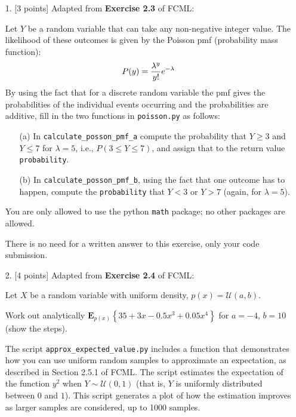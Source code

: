 \documentclass[10pt]{article}
\begin{document}
\begin{itemize}

\item[1.] [3 points]
Adapted from {\bf Exercise 2.3} of FCML:

Let $Y$ be a random variable that can take any non-negative integer value.  The likelihood of these outcomes is given by the Poisson pmf (probability mass function):
\begin{eqnarray}
P(y) = {\lambda^y\over y!} e^{-\lambda}
\end{eqnarray}
By using the fact that for a discrete random variable the pmf gives the probabilities of the individual events occurring and the probabilities are additive, fill in the two functions in {\tt poisson.py} as follows:
\begin{enumerate}
\item[(a)] In {\tt calculate\_posson\_pmf\_a} compute the probability that $Y \geq 3$ and $Y \leq 7$ for $\lambda = 5$, i.e., $P(3 \leq Y \leq 7)$, and assign that to the return value {\tt probability}.
\item[(b)] In {\tt calculate\_posson\_pmf\_b}, using the fact that one outcome has to happen, compute the {\tt probability} that $Y < 3$ or $Y > 7$ (again, for $\lambda = 5$).
\end{enumerate}
You are only allowed to use the python {\tt math} package; no other packages are allowed.

There is no need for a written answer to this exercise, only your code submission.



\item[2.] [4 points]
Adapted from {\bf Exercise 2.4} of FCML:

Let $X$ be a random variable with uniform density, $p(x) = \mathcal{U}(a,b)$.

Work out analytically $\mathbf{E}_{p(x)} \left\{ 35 + 3x - 0.5x^3 + 0.05x^4 \right\}$ for $a=-4$, $b=10$ (show the steps).  

The script {\tt approx\_expected\_value.py} includes a function that demonstrates how you can use uniform random samples to approximate an expectation, as described in Section 2.5.1 of FCML.  The script estimates the expectation of the function $y^2$ when $Y \sim \mathcal{U}(0,1)$ (that is, $Y$ is uniformly distributed between $0$ and $1$).  This script generates a plot of how the estimation improves as larger samples are considered, up to 1000 samples.


\end{itemize}
\end{document}
